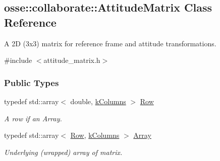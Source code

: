 \hypertarget{classosse_1_1collaborate_1_1_attitude_matrix}{}\subsection{osse\+:\+:collaborate\+:\+:Attitude\+Matrix Class Reference}
\label{classosse_1_1collaborate_1_1_attitude_matrix}


A 2D (3x3) matrix for reference frame and attitude transformations.  




{\ttfamily \#include $<$attitude\+\_\+matrix.\+h$>$}

\subsubsection*{Public Types}
\begin{DoxyCompactItemize}
\item 
\mbox{\label{classosse_1_1collaborate_1_1_attitude_matrix_ac9df4bd3f06ab890e74afe62d1891344}} 
typedef std\+::array$<$ double, \hyperlink{classosse_1_1collaborate_1_1_attitude_matrix_a7d700f1773cb534bd9f807149ab6d8f7}{k\+Columns} $>$ \hyperlink{classosse_1_1collaborate_1_1_attitude_matrix_ac9df4bd3f06ab890e74afe62d1891344}{Row}
\begin{DoxyCompactList}\small\item\em A row if an Array. \end{DoxyCompactList}\item 
\mbox{\label{classosse_1_1collaborate_1_1_attitude_matrix_a0200c3caaa4dc8e80288a9608ef7ccd3}} 
typedef std\+::array$<$ \hyperlink{classosse_1_1collaborate_1_1_attitude_matrix_ac9df4bd3f06ab890e74afe62d1891344}{Row}, \hyperlink{classosse_1_1collaborate_1_1_attitude_matrix_a7d700f1773cb534bd9f807149ab6d8f7}{k\+Columns} $>$ \hyperlink{classosse_1_1collaborate_1_1_attitude_matrix_a0200c3caaa4dc8e80288a9608ef7ccd3}{Array}
\begin{DoxyCompactList}\small\item\em Underlying (wrapped) array of matrix. \end{DoxyCompactList}\end{DoxyCompactItemize}
